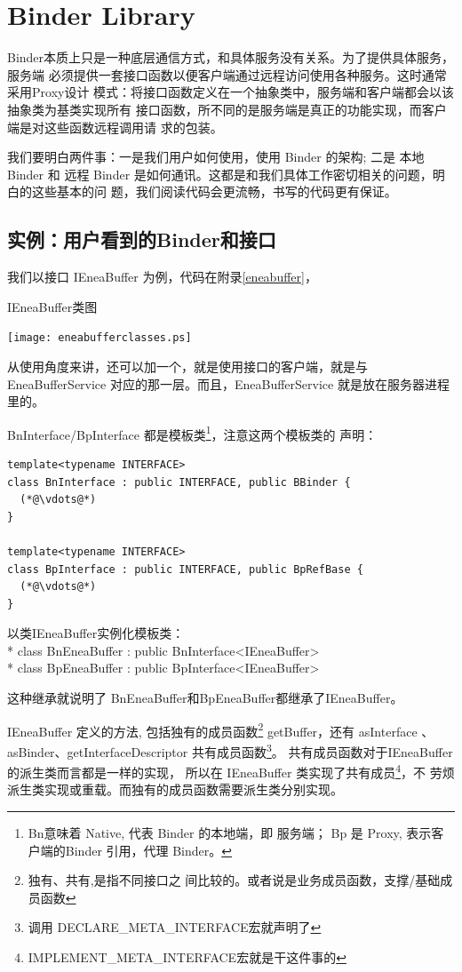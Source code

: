 \documentclass[a4paper,11pt]{article}
\begin{document}
\section{Binder Library}
Binder本质上只是一种底层通信方式，和具体服务没有关系。为了提供具体服务，服务端
必须提供一套接口函数以便客户端通过远程访问使用各种服务。这时通常采用Proxy设计
模式：将接口函数定义在一个抽象类中，服务端和客户端都会以该抽象类为基类实现所有
接口函数，所不同的是服务端是真正的功能实现，而客户端是对这些函数远程调用请
求的包装。

我们要明白两件事：一是我们用户如何使用，使用 Binder 的架构; 二是 本地Binder 和
远程 Binder 是如何通讯。这都是和我们具体工作密切相关的问题，明白的这些基本的问
题，我们阅读代码会更流畅，书写的代码更有保证。

\subsection{实例：用户看到的Binder和接口}

我们以接口 IEneaBuffer 为例，代码在附录\autoref{eneabuffer}，

\caption{IEneaBuffer类图}
\texttt{[image: eneabufferclasses.ps]}

从使用角度来讲，还可以加一个，就是使用接口的客户端，就是与 EneaBufferService
对应的那一层。而且，EneaBufferService 就是放在服务器进程里的。

BnInterface/BpInterface 都是模板类\footnote{Bn意味着 Native, 代表 Binder 的本地端，即
服务端； Bp 是 Proxy, 表示客户端的Binder 引用，代理 Binder。}，注意这两个模板类的
声明：
\begin{lstlisting}
template<typename INTERFACE>
class BnInterface : public INTERFACE, public BBinder {
  (*@\vdots@*)
}

template<typename INTERFACE>
class BpInterface : public INTERFACE, public BpRefBase {
  (*@\vdots@*)
}
\end{lstlisting}

以类IEneaBuffer实例化模板类：\\*
class BnEneaBuffer : public BnInterface<IEneaBuffer> \\*
class BpEneaBuffer : public BpInterface<IEneaBuffer>

这种继承就说明了 BnEneaBuffer和BpEneaBuffer都继承了IEneaBuffer。

IEneaBuffer 定义的方法, 包括独有的成员函数\footnote{独有、共有,是指不同接口之
间比较的。或者说是业务成员函数，支撑/基础成员函数} getBuffer，还有 asInterface
、asBinder、getInterfaceDescriptor 共有成员函数\footnote{调用
DECLARE_META_INTERFACE宏就声明了}。
共有成员函数对于IEneaBuffer的派生类而言都是一样的实现，
所以在 IEneaBuffer 类实现了共有成员\footnote{IMPLEMENT_META_INTERFACE宏就是干这件事的}，不
劳烦派生类实现或重载。而独有的成员函数需要派生类分别实现。
\end{document}
